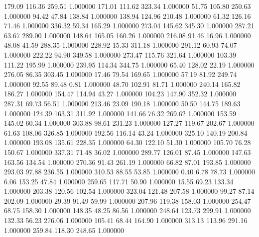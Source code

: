     179.09    116.36    259.51  1.000000
    171.01    111.62    323.34  1.000000
     51.75    105.80    250.63  1.000000
     94.42     47.84    138.84  1.000000
    138.94    124.96    210.48  1.000000
     61.32    126.16     71.46  1.000000
    336.32     59.34    165.29  1.000000
    273.04    145.62    345.30  1.000000
    287.21     63.67    289.00  1.000000
    148.64    165.05    160.26  1.000000
    216.08     91.46     16.96  1.000000
     48.08     41.59    288.35  1.000000
    228.92     15.33    311.18  1.000000
    291.12     60.93     74.07  1.000000
    222.22     94.90    349.58  1.000000
    273.47    115.76    321.64  1.000000
    103.39    111.22    195.99  1.000000
    239.95    114.34    344.75  1.000000
     65.40    128.02     22.19  1.000000
    276.05     86.35    303.45  1.000000
     17.46     79.54    169.65  1.000000
     57.19     81.92    249.74  1.000000
     92.55     89.48      0.81  1.000000
     48.70    102.91     81.71  1.000000
    240.14    165.82    186.27  1.000000
    154.47    114.94     43.27  1.000000
    104.23    147.90    352.32  1.000000
    287.31     69.73     56.51  1.000000
    213.46     23.09    190.18  1.000000
     50.50    144.75    189.63  1.000000
    124.39    163.31    311.92  1.000000
    141.66     76.32    269.62  1.000000
    153.59    145.02     60.34  1.000000
    303.88     98.61    231.23  1.000000
    127.27    119.67    202.67  1.000000
     61.63    108.06    326.85  1.000000
    192.56    116.14     43.24  1.000000
    325.10    140.19    200.84  1.000000
    193.08    135.61    228.35  1.000000
     64.30    122.10     51.30  1.000000
    105.70     76.28    150.67  1.000000
    337.31     71.48     36.02  1.000000
    289.77    126.01     87.45  1.000000
    147.63    163.56    134.54  1.000000
    270.36     91.43    261.19  1.000000
     66.82     87.01    193.85  1.000000
    293.03     97.88    236.55  1.000000
    310.53     88.55     53.85  1.000000
      0.40      6.78     78.73  1.000000
      6.06    153.25     47.84  1.000000
    259.65    117.71     50.90  1.000000
     15.55     69.23    133.34  1.000000
    203.38    120.56    102.54  1.000000
    323.04    121.48    207.58  1.000000
     99.27     87.14    202.09  1.000000
     29.39     91.49     59.99  1.000000
    207.96    119.38    158.03  1.000000
    254.47     68.75    158.30  1.000000
    148.35     48.25     86.56  1.000000
    248.64    123.73    299.91  1.000000
    132.33     56.23    276.06  1.000000
    105.41     68.44    164.90  1.000000
    313.13    113.96    291.16  1.000000
    259.84    118.30    248.65  1.000000
